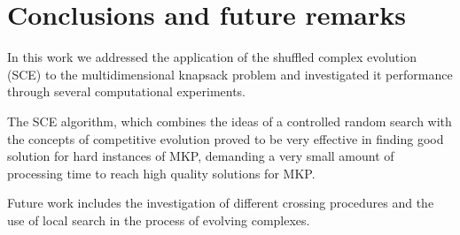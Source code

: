 \documentclass[10pt,conference, compsocconf]{IEEEtran}
\begin{document}
\section{Conclusions and future remarks}
\label{sec:conc}

In this work we addressed the application of the shuffled complex
evolution (SCE) to the multidimensional knapsack problem and investigated it
performance through several computational experiments.

The SCE algorithm, which combines the ideas of a controlled random search with
the concepts of competitive evolution proved to be very effective in finding
good solution for hard instances of MKP, demanding a very small amount of
processing time to reach high quality solutions for MKP.

Future work includes the investigation of different crossing procedures 
and the use of local search in the process of evolving complexes.

%



\end{document}

